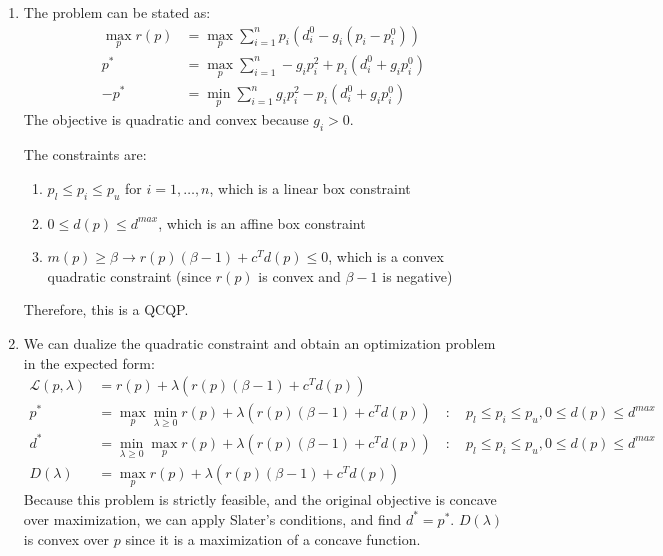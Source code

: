 \documentclass[11pt]{article}
\newcommand{\Lagr}{\mathcal{L}}
\begin{document}
\begin{solution}
\begin{enumerate}
\item The problem can be stated as:
    \begin{align*}
        \max_{p} r(p) &= \max_{p} \sum_{i=1}^n p_i (d_i^0 - g_i(p_i - p_i^0)) \\
        p^* &= \max_{p} \sum_{i=1}^n -g_i p_i^2 + p_i(d_i^0 + g_i p_i^0) \\
        -p^* &= \min_p \sum_{i=1}^n g_i p_i^2 - p_i(d_i^0 + g_i p_i^0)
    \end{align*}
    The objective is quadratic and convex because $g_i > 0$.

    The constraints are:
        \begin{enumerate}
        \item $p_l \leq p_i \leq p_u$ for $i = 1, \dots, n$, which is a linear box constraint
        \item $0 \leq d(p) \leq d^{max}$, which is an affine box constraint
        \item $m(p) \geq \beta \rightarrow r(p)(\beta - 1) + c^T d(p) \leq 0$, which is a convex quadratic constraint (since $r(p)$ is convex and $\beta - 1$ is negative)
        \end{enumerate}
    Therefore, this is a QCQP.

\item We can dualize the quadratic constraint and obtain an optimization problem in the expected form:
    \begin{align*}
        \Lagr(p, \lambda) &= r(p) + \lambda (r(p)(\beta - 1) + c^T d(p)) \\
        p^* &= \max_p \min_{\lambda \geq 0} r(p) + \lambda (r(p)(\beta - 1) + c^T d(p)) \quad : \quad p_l \leq p_i \leq p_u, 0 \leq d(p) \leq d^{max} \\
        d^* &= \min_{\lambda \geq 0} \max_p r(p) + \lambda (r(p)(\beta - 1) + c^T d(p)) \quad : \quad p_l \leq p_i \leq p_u, 0 \leq d(p) \leq d^{max} \\
        D(\lambda) &= \max_p r(p) + \lambda (r(p)(\beta - 1) + c^T d(p))
    \end{align*}
        Because this problem is strictly feasible, and the original objective is concave over maximization, we can apply Slater's conditions, and find $d^* = p^*$. $D(\lambda)$ is convex over $p$ since it is a maximization of a concave function.


\end{enumerate}
\end{solution}
\end{document}
